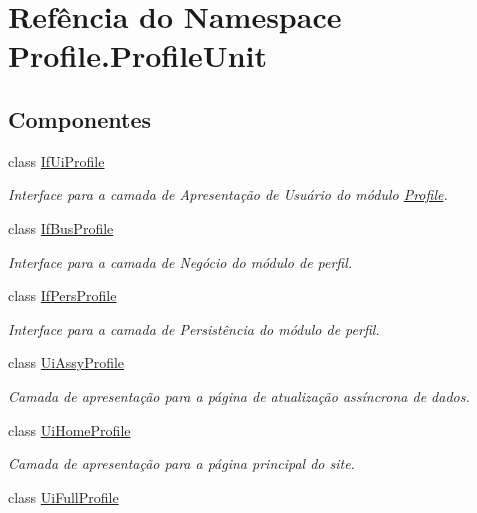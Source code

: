 \hypertarget{namespaceProfile_1_1ProfileUnit}{\section{Refência do Namespace Profile.\-Profile\-Unit}
\label{namespaceProfile_1_1ProfileUnit}
}
\subsection*{Componentes}
\begin{DoxyCompactItemize}
\item 
class \hyperlink{classProfile_1_1ProfileUnit_1_1IfUiProfile}{If\-Ui\-Profile}
\begin{DoxyCompactList}\small\item\em Interface para a camada de Apresentação de Usuário do módulo \hyperlink{namespaceProfile}{Profile}. \end{DoxyCompactList}\item 
class \hyperlink{classProfile_1_1ProfileUnit_1_1IfBusProfile}{If\-Bus\-Profile}
\begin{DoxyCompactList}\small\item\em Interface para a camada de Negócio do módulo de perfil. \end{DoxyCompactList}\item 
class \hyperlink{classProfile_1_1ProfileUnit_1_1IfPersProfile}{If\-Pers\-Profile}
\begin{DoxyCompactList}\small\item\em Interface para a camada de Persistência do módulo de perfil. \end{DoxyCompactList}\item 
class \hyperlink{classProfile_1_1ProfileUnit_1_1UiAssyProfile}{Ui\-Assy\-Profile}
\begin{DoxyCompactList}\small\item\em Camada de apresentação para a página de atualização assíncrona de dados. \end{DoxyCompactList}\item 
class \hyperlink{classProfile_1_1ProfileUnit_1_1UiHomeProfile}{Ui\-Home\-Profile}
\begin{DoxyCompactList}\small\item\em Camada de apresentação para a página principal do site. \end{DoxyCompactList}\item 
class \hyperlink{classProfile_1_1ProfileUnit_1_1UiFullProfile}{Ui\-Full\-Profile}

\end{DoxyCompactItemize}
